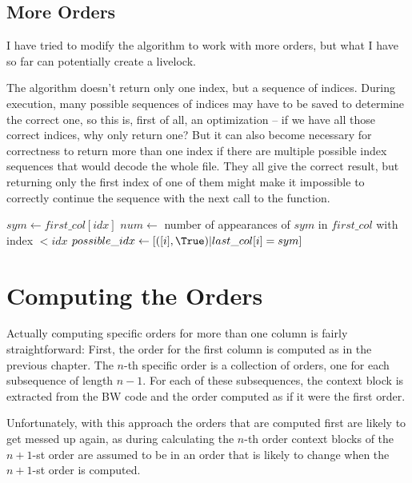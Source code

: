 \documentclass[a4paper]{scrreprt}
\begin{document}

\subsection{More Orders}

I have tried to modify the algorithm to work with more orders, but what I have
so far can potentially create a livelock.

The algorithm doesn't return only one index, but a sequence of indices. During
execution, many possible sequences of indices may have to be saved to
determine the correct one, so this is, first of all, an optimization -- if we
have all those correct indices, why only return one? But it can also become
necessary for correctness to return more than one index if there are multiple
possible index sequences that would decode the whole file. They all give the
correct result, but returning only the first index of one of them might make it
impossible to correctly continue the sequence with the next call to the
function.

\begin{algorithmic}[1]
\State $sym \gets first\_col[idx]$
\State $num \gets$ number of appearances of $sym$ in $first\_col$ with index $<
idx$
\State $possible\_idx \gets [([i], \True) | last\_col[i] = sym]$
\EndProcedure
\end{algorithmic}

\section{Computing the Orders}

Actually computing specific orders for more than one column is fairly
straightforward: First, the order for the first column is computed as in the
previous chapter. The \(n\)-th specific order is a collection of orders, one for
each subsequence of length \(n - 1\). For each of these subsequences, the
context block is extracted from the BW code and the order computed as if it were
the first order.


Unfortunately, with this approach the orders that are computed first are likely
to get messed up again, as during calculating the \(n\)-th order context blocks
of the \(n + 1\)-st order are assumed to be in an order that is likely to change
when the \(n + 1\)-st order is computed.
\end{document}
